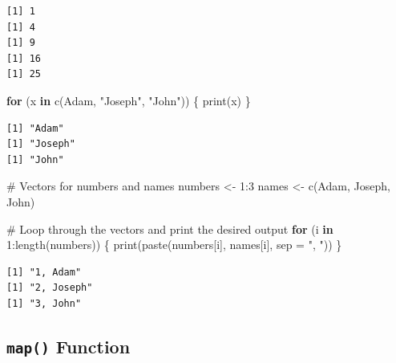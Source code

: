 \documentclass[
  letterpaper,
  DIV=11,
  numbers=noendperiod]{scrreprt}
\newenvironment{Shaded}{\begin{snugshade}}{\end{snugshade}}
\newcommand{\AttributeTok}[1]{\textcolor[rgb]{0.40,0.45,0.13}{#1}}
\newcommand{\CommentTok}[1]{\textcolor[rgb]{0.37,0.37,0.37}{#1}}
\newcommand{\ControlFlowTok}[1]{\textcolor[rgb]{0.00,0.23,0.31}{\textbf{#1}}}
\newcommand{\DecValTok}[1]{\textcolor[rgb]{0.68,0.00,0.00}{#1}}
\newcommand{\FunctionTok}[1]{\textcolor[rgb]{0.28,0.35,0.67}{#1}}
\newcommand{\NormalTok}[1]{\textcolor[rgb]{0.00,0.23,0.31}{#1}}
\newcommand{\OtherTok}[1]{\textcolor[rgb]{0.00,0.23,0.31}{#1}}
\newcommand{\SpecialCharTok}[1]{\textcolor[rgb]{0.37,0.37,0.37}{#1}}
\newcommand{\StringTok}[1]{\textcolor[rgb]{0.13,0.47,0.30}{#1}}
\begin{document}
\begin{verbatim}
[1] 1
[1] 4
[1] 9
[1] 16
[1] 25
\end{verbatim}

\begin{Shaded}
\begin{Highlighting}[]
\ControlFlowTok{for}\NormalTok{ (x }\ControlFlowTok{in} \FunctionTok{c}\NormalTok{(}\StringTok{\textquotesingle{}Adam\textquotesingle{}}\NormalTok{, }\StringTok{"Joseph"}\NormalTok{, }\StringTok{"John"}\NormalTok{)) \{}
    \FunctionTok{print}\NormalTok{(x)}
\NormalTok{\}}
\end{Highlighting}
\end{Shaded}

\begin{verbatim}
[1] "Adam"
[1] "Joseph"
[1] "John"
\end{verbatim}

\begin{Shaded}
\begin{Highlighting}[]
\CommentTok{\# Vectors for numbers and names}
\NormalTok{numbers }\OtherTok{\textless{}{-}} \DecValTok{1}\SpecialCharTok{:}\DecValTok{3}
\NormalTok{names }\OtherTok{\textless{}{-}} \FunctionTok{c}\NormalTok{(}\StringTok{\textquotesingle{}Adam\textquotesingle{}}\NormalTok{, }\StringTok{\textquotesingle{}Joseph\textquotesingle{}}\NormalTok{, }\StringTok{\textquotesingle{}John\textquotesingle{}}\NormalTok{)}

\CommentTok{\# Loop through the vectors and print the desired output}
\ControlFlowTok{for}\NormalTok{ (i }\ControlFlowTok{in} \DecValTok{1}\SpecialCharTok{:}\FunctionTok{length}\NormalTok{(numbers)) \{}
    \FunctionTok{print}\NormalTok{(}\FunctionTok{paste}\NormalTok{(numbers[i], names[i], }\AttributeTok{sep =} \StringTok{", "}\NormalTok{))}
\NormalTok{\}}
\end{Highlighting}
\end{Shaded}

\begin{verbatim}
[1] "1, Adam"
[1] "2, Joseph"
[1] "3, John"
\end{verbatim}

\subsection{\texorpdfstring{\texttt{map()}
Function}{map() Function}}\label{map-function-1}
\end{document}
